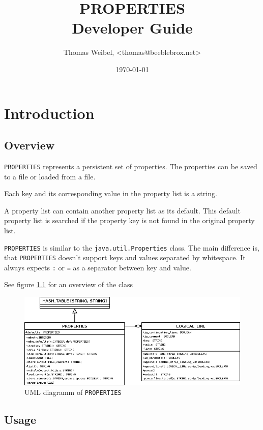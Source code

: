 \documentclass[a4paper,fleqn]{report}
\title{PROPERTIES \\ Developer Guide}
\author{Thomas Weibel, <thomas@beeblebrox.net>}
\date{\today}
\begin{document}
\maketitle

\tableofcontents

\chapter{Introduction}
\label{cha:introduction}


\section{Overview}
\label{sec:overview}

\texttt{PROPERTIES} represents a persistent set of properties. The
properties can be saved to a file or loaded from a file.

Each key and its corresponding value in the property list is a string.

A property list can contain another property list as its default. This
default property list is searched if the property key is not found in
the original property list.

\texttt{PROPERTIES} is similar to the \texttt{java.util.Properties}
class. The main difference is, that \texttt{PROPERTIES} doesn't
support keys and values separated by whitespace. It always expects
\texttt{:} or \texttt{=} as a separator between key and value.

See figure \ref{fig:uml-diagram} for an overview of the class

\begin{figure}[htbp]
  \centering
  \includegraphics[width=\textwidth]{./uml}
  \caption{UML diagramm of \texttt{PROPERTIES}}
  \label{fig:uml-diagram}
\end{figure}


\section{Usage}
\label{sec:usage}
\end{document}

